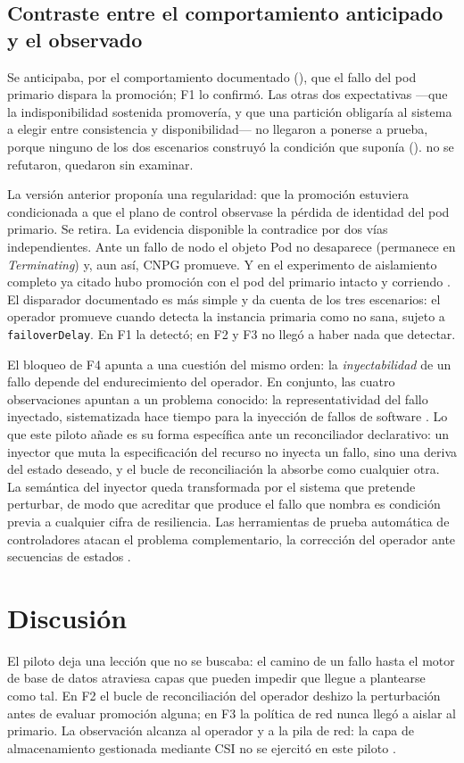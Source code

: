 \subsection{Contraste entre el comportamiento anticipado y el observado}\label{sec:contraste}
Se anticipaba, por el comportamiento documentado (), que el fallo del pod primario dispara la promoción; F1 lo confirmó. Las otras dos expectativas —que la indisponibilidad sostenida promovería, y que una partición obligaría al sistema a elegir entre consistencia y disponibilidad— no llegaron a ponerse a prueba, porque ninguno de los dos escenarios construyó la condición que suponía (). no se refutaron, quedaron sin examinar.

La versión anterior proponía una regularidad: que la promoción estuviera condicionada a que el plano de control observase la pérdida de identidad del pod primario. Se retira. La evidencia disponible la contradice por dos vías independientes. Ante un fallo de nodo el objeto Pod no desaparece  (permanece en \textit{Terminating}) y, aun así, CNPG promueve. Y en el experimento de aislamiento completo ya citado hubo promoción con el pod del primario intacto y corriendo \citep{sivko2026}. El disparador documentado es más simple y da cuenta de los tres escenarios: el operador promueve cuando detecta la instancia primaria como no sana, sujeto a \texttt{failoverDelay}. En F1 la detectó; en F2 y F3 no llegó a haber nada que detectar.

El bloqueo de F4 apunta a una cuestión del mismo orden: la \textit{inyectabilidad} de un fallo depende del endurecimiento del operador. En conjunto, las cuatro observaciones apuntan a un problema conocido: la representatividad del fallo inyectado, sistematizada hace tiempo para la inyección de fallos de software \citep{natella2016}. Lo que este piloto añade es su forma específica ante un reconciliador declarativo: un inyector que muta la especificación del recurso no inyecta un fallo, sino una deriva del estado deseado, y el bucle de reconciliación la absorbe como cualquier otra. La semántica del inyector queda transformada por el sistema que pretende perturbar, de modo que acreditar que produce el fallo que nombra es condición previa a cualquier cifra de resiliencia. Las herramientas de prueba automática de controladores atacan el problema complementario, la corrección del operador ante secuencias de estados \citep{sun2022,gu2023}.


\section{Discusión}\label{sec:disc}
El piloto deja una lección que no se buscaba: el camino de un fallo hasta el motor de base de datos atraviesa capas que pueden impedir que llegue a plantearse como tal. En F2 el bucle de reconciliación del operador deshizo la perturbación antes de evaluar promoción alguna; en F3 la política de red nunca llegó a aislar al primario. La observación alcanza al operador y a la pila de red: la capa de almacenamiento gestionada mediante CSI no se ejercitó en este piloto \citep{avizienis2004}.

